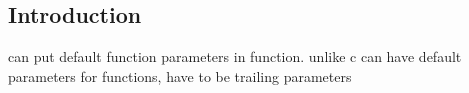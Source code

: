 
\subsection{Introduction}


can put default function parameters in function.
unlike c can have default parameters for functions, have to be trailing parameters
